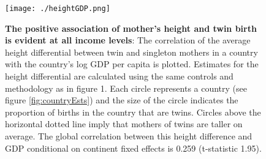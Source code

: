 \documentclass{nature}
\begin{document}
\begin{linenumbers}
\begin{spacing}{1}
\begin{figure}[htpb!]
  \texttt{[image: ./heightGDP.png]}
\vspace{5mm}
\caption{\textbf{The positive association of mother's height and twin birth is evident at all income levels}: {\footnotesize The correlation of the average height differential between twin and singleton mothers in a country with the country's log GDP per capita is plotted.  Estimates for the height differential are calculated using the same controls and methodology as in figure 1.
Each circle represents a country (see figure \ref{fig:countryEsts}) and the size of the circle indicates the proportion of births in the country that are twins. Circles above the horizontal dotted line imply that mothers of twins are taller on average. The global correlation between this height difference and GDP conditional on continent fixed effects is 0.259 (t-statistic 1.95).}} %
\label{fig:GDPEsts}
\end{figure}



\end{spacing}
\end{linenumbers}
\end{document}
